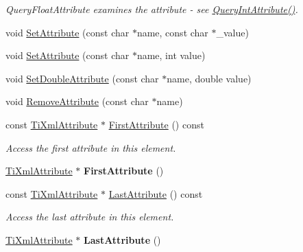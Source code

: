 \begin{DoxyCompactItemize}
\begin{DoxyCompactList}\small\item\em \-Query\-Float\-Attribute examines the attribute -\/ see \hyperlink{classTiXmlElement_aea0bfe471380f281c5945770ddbf52b9}{\-Query\-Int\-Attribute()}. \end{DoxyCompactList}\item 
void \hyperlink{classTiXmlElement_abf0b3bd7f0e4c746a89ec6e7f101fc32}{\-Set\-Attribute} (const char $\ast$name, const char $\ast$\-\_\-value)
\item 
void \hyperlink{classTiXmlElement_ace6f4be75e373726d4774073d666d1a7}{\-Set\-Attribute} (const char $\ast$name, int value)
\item 
void \hyperlink{classTiXmlElement_a0d1dd975d75496778177e35abfe0ec0b}{\-Set\-Double\-Attribute} (const char $\ast$name, double value)
\item 
void \hyperlink{classTiXmlElement_a56979767deca794376b1dfa69a525b2a}{\-Remove\-Attribute} (const char $\ast$name)
\item 
\hypertarget{classTiXmlElement_a516054c9073647d6cb29b6abe9fa0592}{
const \hyperlink{classTiXmlAttribute}{\-Ti\-Xml\-Attribute} $\ast$ \hyperlink{classTiXmlElement_a516054c9073647d6cb29b6abe9fa0592}{\-First\-Attribute} () const }
\label{db/d59/classTiXmlElement_a516054c9073647d6cb29b6abe9fa0592}

\begin{DoxyCompactList}\small\item\em \-Access the first attribute in this element. \end{DoxyCompactList}\item 
\hypertarget{classTiXmlElement_a4b33780fc565d38d6b54f640e0cf1737}{
\hyperlink{classTiXmlAttribute}{\-Ti\-Xml\-Attribute} $\ast$ {\bfseries \-First\-Attribute} ()}
\label{db/d59/classTiXmlElement_a4b33780fc565d38d6b54f640e0cf1737}

\item 
\hypertarget{classTiXmlElement_a86191b49f9177be132b85b14655f1381}{
const \hyperlink{classTiXmlAttribute}{\-Ti\-Xml\-Attribute} $\ast$ \hyperlink{classTiXmlElement_a86191b49f9177be132b85b14655f1381}{\-Last\-Attribute} () const }
\label{db/d59/classTiXmlElement_a86191b49f9177be132b85b14655f1381}

\begin{DoxyCompactList}\small\item\em \-Access the last attribute in this element. \end{DoxyCompactList}\item 
\hypertarget{classTiXmlElement_a222f81cf06155cd108f2a68d4d176004}{
\hyperlink{classTiXmlAttribute}{\-Ti\-Xml\-Attribute} $\ast$ {\bfseries \-Last\-Attribute} ()}
\label{db/d59/classTiXmlElement_a222f81cf06155cd108f2a68d4d176004}


\end{DoxyCompactItemize}
